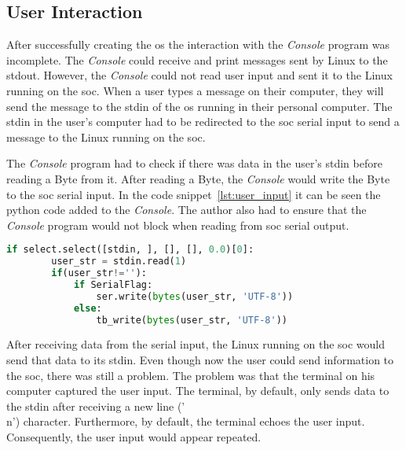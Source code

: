 \subsection{User Interaction}
After successfully creating the \acrlong{os} the interaction with the \textit{Console} program was incomplete. The \textit{Console} could receive and print messages sent by Linux to the stdout. However, the \textit{Console} could not read user input and sent it to the Linux running on the \acrshort{soc}. When a user types a message on their computer, they will send the message to the stdin of the \acrshort{os} running in their personal computer. The stdin in the user's computer had to be redirected to the \acrshort{soc} serial input to send a message to the Linux running on the \acrshort{soc}.

The \textit{Console} program had to check if there was data in the user's stdin before reading a Byte from it. After reading a Byte, the \textit{Console} would write the Byte to the \acrshort{soc} serial input. In the code snippet~\ref{lst:user_input} it can be seen the python code added to the \textit{Console}. The author also had to ensure that the \textit{Console} program would not block when reading from \acrshort{soc} serial output.

\begin{lstlisting}[language=Python, caption={Read user input and send to the \acrshort{soc}.}, label=lst:user_input]
    if select.select([stdin, ], [], [], 0.0)[0]:
        user_str = stdin.read(1)
        if(user_str!=''):
            if SerialFlag:
                ser.write(bytes(user_str, 'UTF-8'))
            else:
                tb_write(bytes(user_str, 'UTF-8'))
\end{lstlisting}

After receiving data from the serial input, the Linux running on the \acrshort{soc} would send that data to its stdin. Even though now the user could send information to the \acrshort{soc}, there was still a problem. The problem was that the terminal on his computer captured the user input. The terminal, by default, only sends data to the stdin after receiving a new line ('\\n') character. Furthermore, by default, the terminal echoes the user input. Consequently, the user input would appear repeated.

